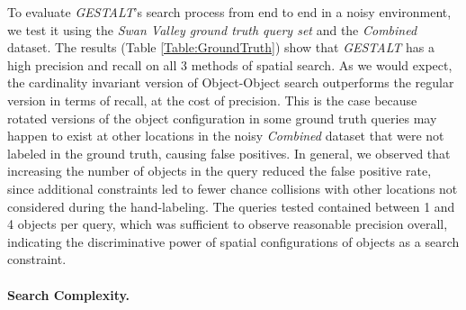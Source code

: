 To evaluate \emph{GESTALT}'s search process from end to end in a noisy environment, we test it using the \textit{Swan Valley ground truth query set} and the \textit{Combined} dataset.
The results (Table \ref{Table:GroundTruth}) show that \emph{GESTALT} has a high precision and recall on all 3 methods of spatial search.
As we would expect, the cardinality invariant version of Object-Object search outperforms the regular version in terms of recall, at the cost of precision.
This is the case because rotated versions of the object configuration in some ground truth queries may happen to exist at other locations in the noisy \textit{Combined} dataset that were not labeled in the ground truth, causing false positives.
In general, we observed that increasing the number of objects in the query reduced the false positive rate, since additional constraints led to fewer chance collisions with other locations not considered during the hand-labeling.
The queries tested contained between 1 and 4 objects per query, which was sufficient to observe reasonable precision overall, indicating the discriminative power of spatial configurations of objects as a search constraint.




\paragraph{Search Complexity.}

